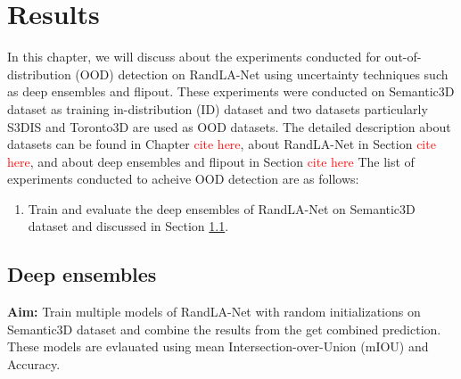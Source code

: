 

    \chapter{Results}
    In this chapter, we will discuss about the experiments conducted for out-of-distribution (OOD) detection on RandLA-Net using uncertainty techniques such as deep ensembles and flipout.
    These experiments were conducted on Semantic3D dataset as training in-distribution (ID) dataset and two datasets particularly S3DIS and Toronto3D are used as OOD datasets. 
    The detailed description about datasets can be found in Chapter \textcolor{red}{cite here}, about RandLA-Net in Section \textcolor{red}{cite here}, and about deep ensembles and flipout in Section \textcolor{red}{cite here}
    The list of experiments conducted to acheive OOD detection are as follows:
    \begin{enumerate}
        \item Train and evaluate the deep ensembles of RandLA-Net on Semantic3D dataset and discussed in Section \ref{sec:deepensemble_train}.
    \end{enumerate}

    \section{Deep ensembles}
    \label{sec:deepensemble_train}
    \textbf{Aim:} Train multiple models of RandLA-Net with random initializations on Semantic3D dataset and combine the results from the get combined prediction. 
    These models are evlauated using mean Intersection-over-Union (mIOU) and Accuracy.

